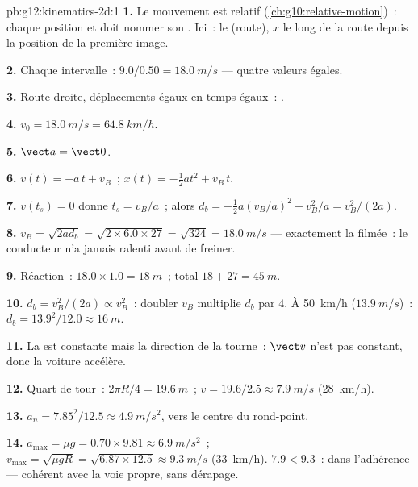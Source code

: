 \begin{solution}{pb:g12:kinematics-2d:1}
\textbf{1.} Le mouvement est relatif (\cref{ch:g10:relative-motion})~:
chaque position et  doit nommer son . Ici~: le
 (route), $x$ le long de la route depuis la position
de la première image.

\textbf{2.} Chaque intervalle~: $9.0/0.50 = \qty{18.0}{m/s}$ --- quatre
valeurs égales.

\textbf{3.} Route droite, déplacements égaux en temps égaux~:
.

\textbf{4.} $v_0 = \qty{18.0}{m/s} = \qty{64.8}{km/h}$.

\textbf{5.} $\vect a = \vect 0$.

\textbf{6.} $v(t) = -a\,t + v_B$~; $x(t) = -\tfrac12 a t^2 + v_B\,t$.

\textbf{7.} $v(t_s) = 0$ donne $t_s = v_B/a$~; alors
$d_b = -\tfrac12 a (v_B/a)^2 + v_B^2/a = v_B^2/(2a)$.

\textbf{8.} $v_B = \sqrt{2 a d_b} = \sqrt{2 \times 6.0 \times 27} =
\sqrt{324} = \qty{18.0}{m/s}$ --- exactement la
 filmée~: le conducteur n'a jamais ralenti avant
de freiner.

\textbf{9.} Réaction~: $18.0 \times 1.0 = \qty{18}{m}$~; total
$18 + 27 = \qty{45}{m}$.

\textbf{10.} $d_b = v_B^2/(2a) \propto v_B^2$~: doubler $v_B$ multiplie
$d_b$ par $4$. À \qty{50}{km/h} ($\qty{13.9}{m/s}$)~:
$d_b = 13.9^2/12.0 \approx \qty{16}{m}$.

\textbf{11.} La  est constante mais la direction de la
 tourne~: $\vect v$ n'est pas constant, donc la voiture
accélère.

\textbf{12.} Quart de tour~: $2\pi R/4 = \qty{19.6}{m}$~;
$v = 19.6/2.5 \approx \qty{7.9}{m/s}$ (\qty{28}{km/h}).

\textbf{13.} $a_n = 7.85^2/12.5 \approx \qty{4.9}{m/s^2}$, vers le
centre du rond-point.

\textbf{14.} $a_{\max} = \mu g = 0.70 \times 9.81 \approx
\qty{6.9}{m/s^2}$~; $v_{\max} = \sqrt{\mu g R} =
\sqrt{6.87 \times 12.5} \approx \qty{9.3}{m/s}$ (\qty{33}{km/h}).
$7.9 < 9.3$~: dans l'adhérence --- cohérent avec la voie propre, sans
dérapage.


\end{solution}
